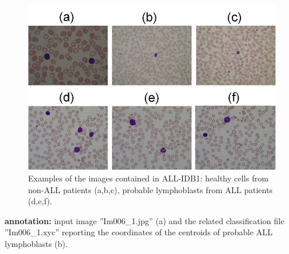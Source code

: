 \begin{figure}[H]
\centering
\includegraphics{../images/ALLIDB1.jpg}
\caption{Examples of the images contained in ALL-IDB1: healthy cells from non-ALL patients (a,b,c), probable lymphoblasts from ALL patients (d,e,f). }
\end{figure}


\textbf{annotation:} input image ''Im006\_1.jpg'' (a) and the related classification file ''Im006\_1.xyc'' reporting the coordinates of the centroids of probable ALL lymphoblasts (b).



